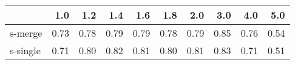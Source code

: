 \begin{tabular}{lrrrrrrrrr}
\toprule
{} &  1.0 &  1.2 &  1.4 &  1.6 &  1.8 &  2.0 &  3.0 &  4.0 &  5.0 \\
\midrule
s-merge  & 0.73 & 0.78 & 0.79 & 0.79 & 0.78 & 0.79 & 0.85 & 0.76 & 0.54 \\
s-single & 0.71 & 0.80 & 0.82 & 0.81 & 0.80 & 0.81 & 0.83 & 0.71 & 0.51 \\
\bottomrule
\end{tabular}
